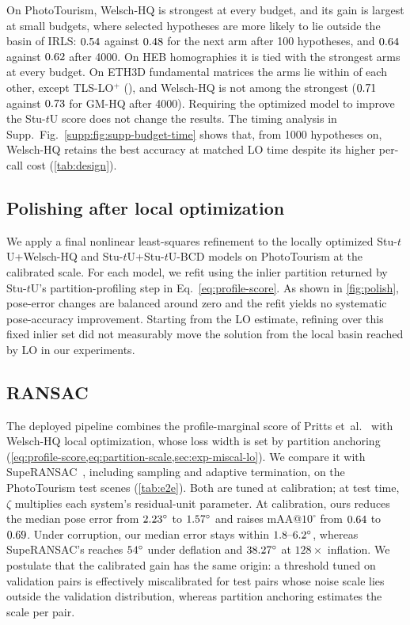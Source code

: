 \documentclass[runningheads]{llncs}
\newcommand{\suppfig}[1]{Supp.\ Fig.~\ref{supp:#1}}
\newcommand{\stuU}{Stu-$t$U}          %
\begin{document}
On PhotoTourism, Welsch-HQ is strongest at every budget, and its gain is
largest at small budgets, where selected hypotheses are more likely to lie
outside the basin of IRLS: $0.54$ against $0.48$ for the
next arm after 100 hypotheses, and $0.64$ against $0.62$
after 4000. On HEB homographies it is tied with the strongest arms at
every budget. On ETH3D fundamental matrices the arms
lie within \BudFSpread{} of each other, except TLS-LO$^+$ (\BudFLOPlus{}), and Welsch-HQ is not among the
strongest ($0.71$ against $0.73$ for GM-HQ after 4000). Requiring
the optimized model to improve the \stuU{} score does not change the
results. The
timing analysis in \suppfig{fig:supp-budget-time} shows that, from 1000 hypotheses on, Welsch-HQ retains the best
accuracy at matched LO time despite its higher per-call cost
(\cref{tab:design}).


\subsection{Polishing after local optimization}
\label{sec:exp-polish}
We apply a final nonlinear least-squares refinement to the locally optimized
\stuU{}+Welsch-HQ and \stuU{}+\stuU{}-BCD models on PhotoTourism at the
calibrated scale. For each model, we refit using the inlier partition returned
by \stuU{}'s partition-profiling step in Eq.~\eqref{eq:profile-score}.
As shown in \cref{fig:polish}, pose-error changes are balanced around zero and
the refit yields no systematic pose-accuracy improvement. Starting from the
LO estimate, refining over this fixed inlier set did not measurably
move the solution from the local basin reached by LO in our experiments.


\subsection{RANSAC}
\label{sec:exp-e2e}
The deployed pipeline combines the profile-marginal score of Pritts
et~al.~\cite{PrittsScoring2026} with Welsch-HQ local optimization, whose
loss width is set by partition anchoring
(\cref{eq:profile-score,eq:partition-scale,sec:exp-miscal-lo}). We compare
it with SupeRANSAC~\cite{BarathSupeRANSAC2025}, including sampling and
adaptive termination, on the \PTTestScenes{} PhotoTourism test scenes (\cref{tab:e2e}).
Both are tuned at calibration; at test time, $\zeta$ multiplies each
system's residual-unit parameter. At calibration, ours reduces the median
pose error from $2.23^\circ$ to $1.57^\circ$ and raises
mAA@$10^\circ$ from $0.64$ to $0.69$. Under corruption, our
median error stays within $1.8\text{--}6.2^\circ$, whereas SupeRANSAC's
reaches $54^\circ$ under deflation and $38.27^\circ$
at $128\times$ inflation. We postulate that the calibrated gain has the
same origin: a threshold tuned on validation pairs is effectively
miscalibrated for test pairs whose noise scale lies outside the validation
distribution, whereas partition anchoring estimates the scale per pair.
\end{document}
